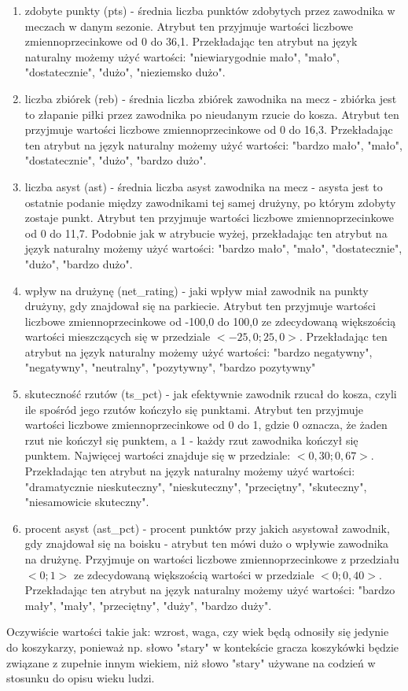 \documentclass{classrep}
\begin{document}
\begin{itemize}
\begin{enumerate}
        \item zdobyte punkty (pts) - średnia liczba punktów zdobytych przez zawodnika w meczach w danym sezonie. Atrybut ten przyjmuje wartości liczbowe zmiennoprzecinkowe od 0 do 36,1. Przekładając ten atrybut na język naturalny możemy użyć wartości: "niewiarygodnie mało", "mało", "dostatecznie", "dużo", "nieziemsko dużo".
        \item liczba zbiórek (reb) - średnia liczba zbiórek zawodnika na mecz - zbiórka jest to złapanie piłki przez zawodnika po nieudanym rzucie do kosza. Atrybut ten przyjmuje wartości liczbowe zmiennoprzecinkowe od 0 do 16,3. Przekładając ten atrybut na język naturalny możemy użyć wartości: "bardzo mało", "mało", "dostatecznie", "dużo", "bardzo dużo".
        \item liczba asyst (ast) - średnia liczba asyst zawodnika na mecz - asysta jest to ostatnie podanie między zawodnikami tej samej drużyny, po którym zdobyty zostaje punkt. Atrybut ten przyjmuje wartości liczbowe zmiennoprzecinkowe od 0 do 11,7. Podobnie jak w atrybucie wyżej, przekładając ten atrybut na język naturalny możemy użyć wartości: "bardzo mało", "mało", "dostatecznie", "dużo", "bardzo dużo".
        \item wpływ na drużynę (net\_rating) - jaki wpływ miał zawodnik na punkty drużyny, gdy znajdował się na parkiecie. Atrybut ten przyjmuje wartości liczbowe zmiennoprzecinkowe od -100,0 do 100,0 ze zdecydowaną większością wartości mieszczących się w przedziale $<-25,0; 25,0>$. Przekładając ten atrybut na język naturalny możemy użyć wartości:
        "bardzo negatywny", "negatywny", "neutralny", "pozytywny", "bardzo pozytywny"
        \item skuteczność rzutów (ts\_pct) - jak efektywnie zawodnik rzucał do kosza, czyli ile spośród jego rzutów kończyło się punktami. Atrybut ten przyjmuje wartości liczbowe zmiennoprzecinkowe od 0 do 1, gdzie 0 oznacza, że żaden rzut nie kończył się punktem, a 1 - każdy rzut zawodnika kończył się punktem. Najwięcej wartości znajduje się w przedziale: $<0,30; 0,67>$.  Przekładając ten atrybut na język naturalny możemy użyć wartości: "dramatycznie nieskuteczny", "nieskuteczny", "przeciętny", "skuteczny", "niesamowicie skuteczny".
        \item procent asyst (ast\_pct) - procent punktów przy jakich asystował zawodnik, gdy znajdował się na boisku - atrybut ten mówi dużo o wpływie zawodnika na drużynę. Przyjmuje on wartości liczbowe zmiennoprzecinkowe z przedziału $<0;1>$ ze zdecydowaną większością wartości w przedziale $<0; 0,40>$. Przekładając ten atrybut na język naturalny możemy użyć wartości: "bardzo mały", "mały", "przeciętny", "duży", "bardzo duży".
    \end{enumerate}
\end{itemize}
Oczywiście wartości takie jak: wzrost, waga, czy wiek będą odnosiły się jedynie do koszykarzy, ponieważ np. słowo "stary" w kontekście gracza koszykówki będzie związane z zupełnie innym wiekiem, niż słowo "stary" używane na codzień w stosunku do opisu wieku ludzi. \\
\end{document}
